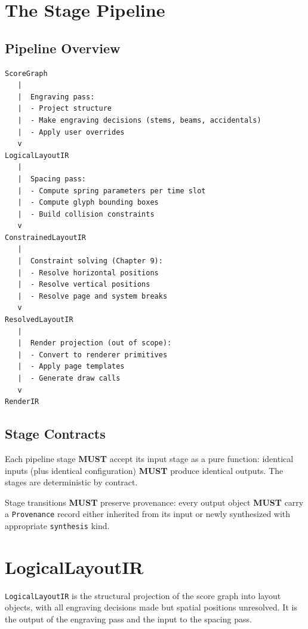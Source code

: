 \documentclass[11pt,letterpaper]{report}
\newcounter{requirement}[chapter]
\newcommand{\MUST}{\textbf{MUST}}
\begin{document}
\section{The Stage Pipeline}
\label{sec:layoutir:pipeline}

\subsection{Pipeline Overview}

\begin{lstlisting}
ScoreGraph
   |
   |  Engraving pass:
   |  - Project structure
   |  - Make engraving decisions (stems, beams, accidentals)
   |  - Apply user overrides
   v
LogicalLayoutIR
   |
   |  Spacing pass:
   |  - Compute spring parameters per time slot
   |  - Compute glyph bounding boxes
   |  - Build collision constraints
   v
ConstrainedLayoutIR
   |
   |  Constraint solving (Chapter 9):
   |  - Resolve horizontal positions
   |  - Resolve vertical positions
   |  - Resolve page and system breaks
   v
ResolvedLayoutIR
   |
   |  Render projection (out of scope):
   |  - Convert to renderer primitives
   |  - Apply page templates
   |  - Generate draw calls
   v
RenderIR
\end{lstlisting}

\subsection{Stage Contracts}

\begin{requirement}
  \label{req:layoutir:deterministic-stage-transitions}
  Each pipeline stage \MUST{} accept its input stage as a pure
  function: identical inputs (plus identical configuration) \MUST{}
  produce identical outputs. The stages are deterministic by
  contract.

  Stage transitions \MUST{} preserve provenance: every output object
  \MUST{} carry a \texttt{Provenance} record either inherited from its
  input or newly synthesized with appropriate \texttt{synthesis} kind.
\end{requirement}

\section{LogicalLayoutIR}
\label{sec:layoutir:logical}

\texttt{LogicalLayoutIR} is the structural projection of the score
graph into layout objects, with all engraving decisions made but
spatial positions unresolved. It is the output of the engraving pass
and the input to the spacing pass.
\end{document}
